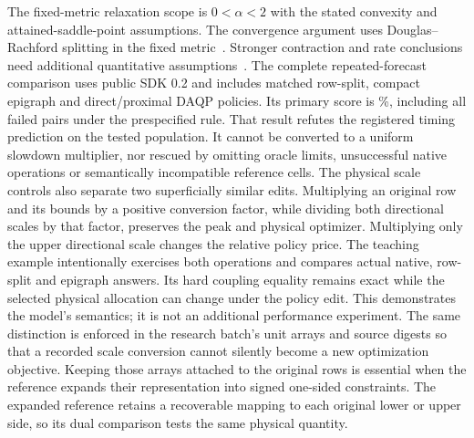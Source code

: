 The fixed-metric relaxation scope is $0<\alpha<2$ with the stated convexity
and attained-saddle-point assumptions. The convergence argument uses
Douglas--Rachford splitting in the fixed metric~\cite{lions,eckstein}.
Stronger contraction and rate conclusions need additional quantitative
assumptions~\cite{giselsson}. The complete repeated-forecast comparison uses
public SDK 0.2 and includes matched row-split, compact epigraph and direct/proximal
DAQP policies. Its primary score is \PrimaryEstimate\%, including all failed
pairs under the prespecified rule. That result refutes the registered timing
prediction on the tested population. It cannot be converted to a uniform
slowdown multiplier, nor rescued by omitting oracle limits, unsuccessful native
operations or semantically incompatible reference cells.
The physical scale controls also separate two superficially similar edits.
Multiplying an original row and its bounds by a positive conversion factor,
while dividing both directional scales by that factor, preserves the peak
and physical optimizer. Multiplying only the upper directional scale changes
the relative policy price. The teaching example intentionally exercises both
operations and compares actual native, row-split and epigraph answers. Its
hard coupling equality remains exact while the selected physical allocation
can change under the policy edit. This demonstrates the model's semantics;
it is not an additional performance experiment. The same distinction is
enforced in the research batch's unit arrays and source digests so that a
recorded scale conversion cannot silently become a new optimization objective.
Keeping those arrays attached to the original rows is essential when the
reference expands their representation into signed one-sided constraints.
The expanded reference retains a recoverable mapping to each original lower
or upper side, so its dual comparison tests the same physical quantity.
